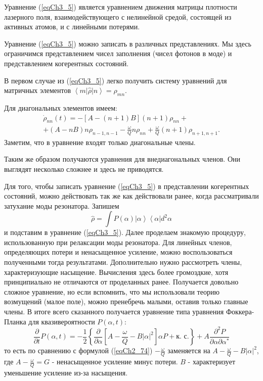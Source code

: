 Уравнение (\ref{eqCh3_5}) является уравнением движения матрицы
плотности лазерного поля, взаимодействующего с нелинейной средой,
состоящей из активных атомов, и с линейными потерями. 

Уравнение (\ref{eqCh3_5}) можно записать в различных
представлениях. Мы здесь ограничимся представлением чисел заполнения
(чисел фотонов в моде) и представлением когерентных состояний. 

В первом случае из (\ref{eqCh3_5}) легко получить систему уравнений
для матричных элементов $\left<m\right|\hat{\rho}\left|n\right> =
\rho_{mn}$.  

Для диагональных элементов имеем:
\begin{eqnarray}
\dot{\rho}_{nn}\left(t\right) = 
-\left[A - \left(n + 1\right)B\right]\left(n + 1\right)\rho_{nn} +
\nonumber \\
+ \left(A - n B\right)n \rho_{n - 1, n - 1} 
- \frac{\omega}{Q}n \rho_{nn} + 
\frac{\omega}{Q} \left(n + 1\right)\rho_{n + 1, n + 1}.
\label{eqCh3_6}
\end{eqnarray}
Заметим, что в уравнение входят только диагональные члены. 

Таким же образом получаются уравнения для внедиагональных членов. Они
выглядят несколько сложнее и здесь не приводятся. 

Для того, чтобы записать уравнение (\ref{eqCh3_5}) в представлении
когерентных состояний, можно действовать так же как действовали ранее,
когда рассматривали затухание моды резонатора. Запишем 
\[
\hat{\rho} = \int
P\left(\alpha\right)\left|\alpha\right>\left<\alpha\right| d^2 \alpha 
\]
и подставим в уравнение (\ref{eqCh3_5}). Далее проделаем знакомую
процедуру, использованную при релаксации моды резонатора. Для линейных
членов, определяющих потери и ненасыщенное усиление, можно
воспользоваться полученными тогда результатами. Дополнительно нужно
рассмотреть члены, характеризующие насыщение. Вычисления здесь более
громоздкие, хотя принципиально не отличаются от проделанных
ранее. Получается довольно сложное уравнение, но если вспомнить, что
мы использовали теорию возмущений (малое поле), можно пренебречь
малыми, оставив только главные члены\cite{bMandel2000}. 
В итоге всего сказанного получается
уравнение типа уравнения Фоккера-Планка для квазивероятности
$P\left(\alpha, t\right)$:  
\begin{equation}
\frac{\partial}{\partial t} P\left(\alpha, t\right) = 
- \frac{1}{2}\left\{ 
\frac{\partial}{\partial \alpha}
\left[
A - \frac{\omega}{Q} - B \left|\alpha\right|^2
\right] \alpha P + \mbox{к. с.}
\right\} + 
A \frac{\partial^2 P}{\partial \alpha \partial \alpha^{*}}
\label{eqCh3_7}
\end{equation}
то есть по сравнению с формулой (\ref{eqCh2_74}) $-\frac{\omega}{Q}$
заменяется на $A - \frac{\omega}{Q} - B\left|\alpha\right|^2$,  где $A
- \frac{\omega}{Q} = G$ - ненасыщенное усиление минус потери. $B$ - 
характеризует уменьшение усиление из-за насыщения. 
